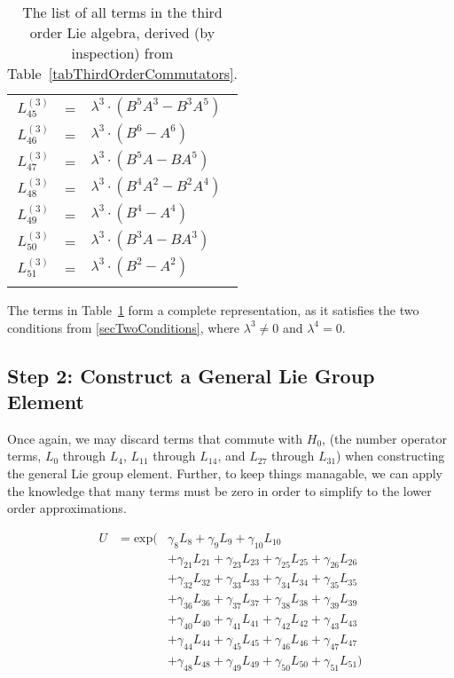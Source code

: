 \documentclass{article}
\begin{document}
\begin{center}
\begin{longtable}{rcl}
$L_{45}^{(3)}$ & = & ${\lambda}^{3}{\cdot}(B^{5}A^{3}-B^{3}A^{5})$ \\*
$L_{46}^{(3)}$ & = & ${\lambda}^{3}{\cdot}(B^{6}-A^{6})$ \\*
$L_{47}^{(3)}$ & = & ${\lambda}^{3}{\cdot}(B^{5}A-BA^{5})$ \\*
$L_{48}^{(3)}$ & = & ${\lambda}^{3}{\cdot}(B^{4}A^{2}-B^{2}A^{4})$ \\*
$L_{49}^{(3)}$ & = & ${\lambda}^{3}{\cdot}(B^{4}-A^{4})$ \\*
$L_{50}^{(3)}$ & = & ${\lambda}^{3}{\cdot}(B^{3}A-BA^{3})$ \\*
$L_{51}^{(3)}$ & = & ${\lambda}^{3}{\cdot}(B^{2}-A^{2})$ \\
\caption{The list of all terms in the third order Lie algebra, derived (by inspection) from Table~\ref{tabThirdOrderCommutators}. \label{tabThirdOrderCompleteTermList}}
\end{longtable}
\end{center}

The terms in Table~\ref{tabThirdOrderCompleteTermList} form a complete representation, as it satisfies the two conditions from \ref{secTwoConditions}, where $\lambda^{3} \neq 0$ and $ \lambda^{4} = 0$.

\clearpage
\newpage

\subsection{Step 2: Construct a General Lie Group Element}

Once again, we may discard terms that commute with $H_{0}$, (the number operator terms, $L_{0}$ through $L_{4}$, $L_{11}$ through $L_{14}$, and $L_{27}$ through $L_{31}$) when constructing the general Lie group element.  Further, to keep things managable, we can apply the knowledge that many terms must be zero in order to simplify to the lower order approximations.

\begin{eqnarray}
U & = \textrm{exp}( & \gamma_{8}L_{8}+\gamma_{9}L_{9}+\gamma_{10}L_{10} \\
  &                 & +\gamma_{21}L_{21}+\gamma_{23}L_{23}+\gamma_{25}L_{25}+\gamma_{26}L_{26} \nonumber \\
  &                 & +\gamma_{32}L_{32}+\gamma_{33}L_{33}+\gamma_{34}L_{34}+\gamma_{35}L_{35} \nonumber \\
  &                 & +\gamma_{36}L_{36}+\gamma_{37}L_{37}+\gamma_{38}L_{38}+\gamma_{39}L_{39} \nonumber \\
  &                 & +\gamma_{40}L_{40}+\gamma_{41}L_{41}+\gamma_{42}L_{42}+\gamma_{43}L_{43} \nonumber \\
  &                 & +\gamma_{44}L_{44}+\gamma_{45}L_{45}+\gamma_{46}L_{46}+\gamma_{47}L_{47} \nonumber \\
  &                 & +\gamma_{48}L_{48}+\gamma_{49}L_{49}+\gamma_{50}L_{50}+\gamma_{51}L_{51} ) \nonumber
\end{eqnarray}
\end{document}
